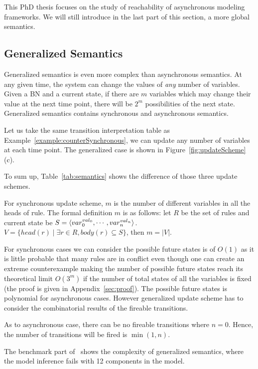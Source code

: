 This PhD thesis focuses on the study of reachability of asynchronous modeling frameworks.
We will still introduce in the last part of this section, a more global semantics.

\subsection{Generalized Semantics}
Generalized semantics is even more complex than asynchronous semantics.
At any given time, the system can change the values of \textit{any} number of variables.
Given a BN and a current state, if there are $m$ variables which may change their value at the next time point, there will be $2^m$ possibilities of the next state.
Generalized semantics contains synchronous and asynchronous semantics.

\begin{example}
Let us take the same transition interpretation table as Example~\ref{example:counterSynchronous}, we can update any number of variables at each time point.
The generalized case is shown in Figure~\ref{fig:updateScheme} (c).
\end{example}

To sum up, Table~\ref{tab:semantics} shows the difference of those three update schemes.

For synchronous update scheme, $m$ is the number of different variables in all the heads of rule.
The formal definition $m$ is as follows:
let $R$ be the set of rules and current state be $S=\langle var_0^{val_0},\cdots, var_n^{val_n}\rangle$. 
$V=\{head(r)\mid \exists r\in R, body(r)\subseteq S\}$, then $m=|V|$.

For synchronous cases we can consider the possible future states is of $O(1)$ as it is little probable that many rules are in conflict even though one can create an extreme counterexample making the number of possible future states reach its theoretical limit $O(3^m)$ if the number of total states of all the variables is fixed (the proof is given in Appendix~\ref{sec:proof}).
The possible future states is polynomial for asynchronous cases.
However generalized update scheme has to consider the combinatorial results of the fireable transitions.

As to asynchronous case, there can be no fireable transitions where $n=0$.
Hence, the number of transitions will be fired is $\min(1,n)$.

The benchmark part of~\cite{ribeiro2018learning} shows the complexity of generalized semantics, where the model inference fails with 12 components in the model. 

